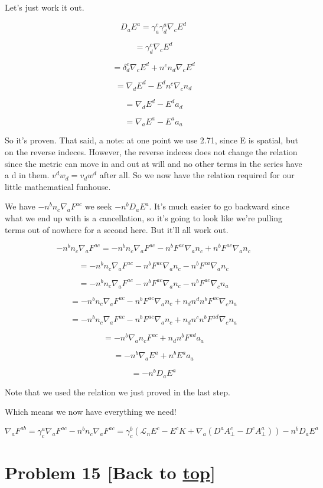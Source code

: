 \documentclass[landscape,letterpaper,10pt,english]{article}
\begin{document}
Let's just work it out.

\[ D_a E^a = \gamma^c_a \gamma^a_d \nabla_c E^d \]

\[ = \gamma^c_d \nabla_c E^d \]

\[ = \delta^c_d \nabla_c E^d + n^c n_d \nabla_c E^d \]

\[ = \nabla_d E^d - E^d n^c \nabla_c n_d \]

\[ = \nabla_dE^d- E^d a_d \]

\[ = \nabla_a E^a - E^a a_a \]

So it's proven. That said, a note: at one point we use 2.71, since E is
spatial, but on the reverse indeces. However, the reverse indeces does
not change the relation since the metric can move in and out at will and
no other terms in the series have a d in them. \(v^dw_d = v_dw^d\) after
all. So we now have the relation required for our little mathematical
funhouse.

    We have \(- n^bn_c\nabla_aF^{ac}\) we seek \(-n^b D_a E^a\). It's much
easier to go backward since what we end up with is a cancellation, so
it's going to look like we're pulling terms out of nowhere for a second
here. But it'll all work out.

\[ - n^bn_c\nabla_aF^{ac} = - n^bn_c\nabla_aF^{ac} -n^b F^{ac} \nabla_a n_c + n^b F^{ac} \nabla_a n_c  \]

\[ = - n^bn_c\nabla_aF^{ac} -n^b F^{ac} \nabla_a n_c - n^b F^{ca} \nabla_a n_c \]

\[ = - n^bn_c\nabla_aF^{ac} -n^b F^{ac} \nabla_a n_c - n^b F^{ac} \nabla_c n_a \]

\[ = - n^bn_c\nabla_aF^{ac} -n^b F^{ac} \nabla_a n_c + n_d n^d n^b F^{ac} \nabla_c n_a \]

\[ = - n^bn_c\nabla_aF^{ac} -n^b F^{ac} \nabla_a n_c + n_d n^c n^b F^{ad} \nabla_c n_a \]

\[ = - n^b  \nabla_a n_c F^{ac} + n_d n^b F^{ad} a_a\]

\[ = - n^b \nabla_a E^a + n^b E^a a_a\]

\[ = - n^b D_a E^a \]

Note that we used the relation we just proved in the last step.

    Which means we now have everything we need!

\[\nabla_a F^{ab} = \gamma^a_c \nabla_a F^{ac} - n^bn_c\nabla_aF^{ac} = \gamma^b_c (\mathcal{L}_n E^c - E^c K + \nabla_a (D^a A^c_\perp - D^c A^a_\perp)) - n^b D_a E^a \]

    \hypertarget{problem-15-back-to-top}{%
\section{\texorpdfstring{Problem 15 {[}Back to
\hyperref[toc]{top}{]}}{Problem 15 {[}Back to {]}}}\label{problem-15-back-to-top}}
\end{document}

